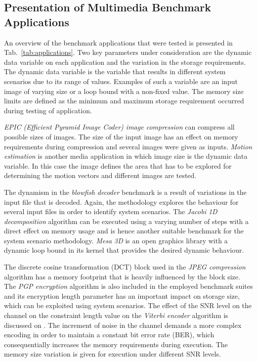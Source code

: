\documentclass{acm_proc_article-sp}
\begin{document}
\subsection{Presentation of Multimedia Benchmark Applications}

An overview of the benchmark applications that were tested is presented in Tab.~\ref{tab:applications}. Two key parameters under consideration are the dynamic data variable on each application and the variation in the storage requirements. The dynamic data variable is the variable that results in different system scenarios due to its range of values. Examples of such a variable are an input image of varying size or a loop bound with a non-fixed value. The memory size limits are defined as the minimum and maximum storage requirement occurred during testing of application.

\textit{EPIC (Efficient Pyramid Image Coder) image compression} can compress all possible sizes of images. The size of the input image has an effect on memory requirements during compression and several images were given as inputs. \textit{Motion estimation} is another media application in which image size is the dynamic data variable. In this case the image defines the area that has to be explored for determining the motion vectors and different images are tested.

The dynamism in the \textit{blowfish decoder} benchmark is a result of variations in the input file that is decoded. Again, the methodology explores the behaviour for several input files in order to identify system scenarios. The \textit{Jacobi 1D decomposition} algorithm can be executed using a varying number of steps with a direct effect on memory usage and is hence another suitable benchmark for the system scenario methodology. \textit{Mesa 3D} is an open graphics library with a dynamic loop bound in its kernel that provides the desired dynamic behaviour. 

The discrete cosine transformation (DCT) block used in the \textit{JPEG compression} algorithm has a memory footprint that is heavily influenced by the block size. The \textit{PGP encryption} algorithm is also included in the employed benchmark suites and its encryption length parameter has an important impact on storage size, which can be exploited using system scenarios. The effect of the SNR level on the channel on the constraint length value on the \textit{Viterbi encoder} algorithm is discussed on \cite{Fil12}. The increment of noise in the channel demands a more complex encoding in order to maintain a constant bit error rate (BER), which consequentially increases the memory requirements during execution. The memory size variation is given for execution under different SNR levels.  
\end{document}
